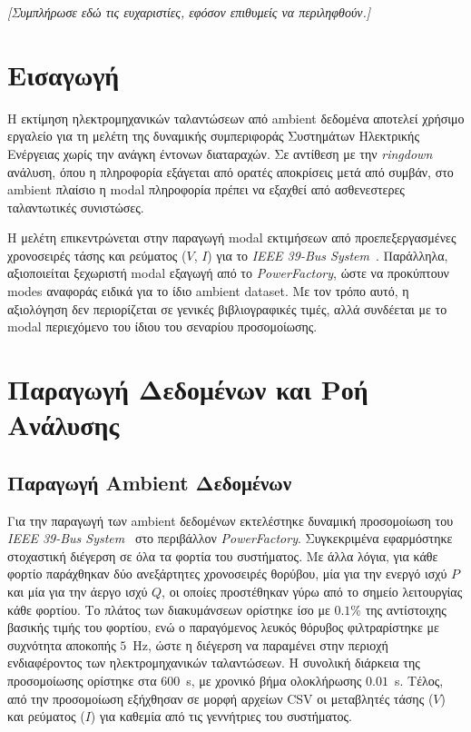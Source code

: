 \documentclass[a4paper,12pt,twoside,openright]{report}
\begin{document}
\newpage
{}
\noindent\textit{[Συμπλήρωσε εδώ τις ευχαριστίες, εφόσον επιθυμείς να περιληφθούν.]}

\renewcommand{\contentsname}{\textsc{Περιεχόμενα}}
\tableofcontents
\renewcommand{\listfigurename}{\textsc{Λίστα Σχημάτων}}
\listoffigures
\renewcommand{\listtablename}{\textsc{Λίστα Πινάκων}}
\listoftables
\cleardoublepage
\pagestyle{mystyle}

\newpage
{}
\setcounter{page}{1}

\chapter{Εισαγωγή}
Η εκτίμηση ηλεκτρομηχανικών ταλαντώσεων από ambient δεδομένα αποτελεί χρήσιμο εργαλείο για τη μελέτη της δυναμικής συμπεριφοράς Συστημάτων Ηλεκτρικής Ενέργειας χωρίς την ανάγκη έντονων διαταραχών. Σε αντίθεση με την \textit{ringdown} ανάλυση, όπου η πληροφορία εξάγεται από ορατές αποκρίσεις μετά από συμβάν, στο ambient πλαίσιο η modal πληροφορία πρέπει να εξαχθεί από ασθενεστερες ταλαντωτικές συνιστώσες.

Η μελέτη επικεντρώνεται στην παραγωγή modal εκτιμήσεων από προεπεξεργασμένες χρονοσειρές τάσης και ρεύματος ($V$, $I$) για το \textit{IEEE 39-Bus System}~\cite{digsilent39}. Παράλληλα, αξιοποιείται ξεχωριστή modal εξαγωγή από το \textit{PowerFactory}, ώστε να προκύπτουν modes αναφοράς ειδικά για το ίδιο ambient dataset. Με τον τρόπο αυτό, η αξιολόγηση δεν περιορίζεται σε γενικές βιβλιογραφικές τιμές, αλλά συνδέεται με το modal περιεχόμενο του ίδιου του σεναρίου προσομοίωσης.



\chapter{Παραγωγή Δεδομένων και Ροή Ανάλυσης}
\section{Παραγωγή Ambient Δεδομένων}
 Για την παραγωγή των ambient δεδομένων εκτελέστηκε δυναμική προσομοίωση του \textit{IEEE 39-Bus System}~\cite{digsilent39} στο περιβάλλον \textit{PowerFactory}. Συγκεκριμένα εφαρμόστηκε  στοχαστική διέγερση σε όλα τα φορτία του συστήματος. Με άλλα λόγια, για κάθε φορτίο παράχθηκαν δύο ανεξάρτητες χρονοσειρές  θορύβου, μία για την ενεργό ισχύ $P$ και μία για την άεργο ισχύ $Q$, οι οποίες προστέθηκαν γύρω από το σημείο λειτουργίας κάθε φορτίου. Το πλάτος των διακυμάνσεων ορίστηκε ίσο με $0.1\%$ της αντίστοιχης βασικής τιμής του φορτίου, ενώ ο παραγόμενος λευκός θόρυβος φιλτραρίστηκε με συχνότητα αποκοπής $5$~Hz, ώστε η διέγερση να παραμένει στην περιοχή ενδιαφέροντος των ηλεκτρομηχανικών ταλαντώσεων. Η συνολική διάρκεια της προσομοίωσης ορίστηκε στα $600$~s, με χρονικό βήμα ολοκλήρωσης $0.01$~s. Τέλος, από την προσομοίωση εξήχθησαν σε μορφή αρχείων CSV οι μεταβλητές τάσης ($V$) και ρεύματος ($I$)  για καθεμία από τις γεννήτριες του συστήματος.
\end{document}

